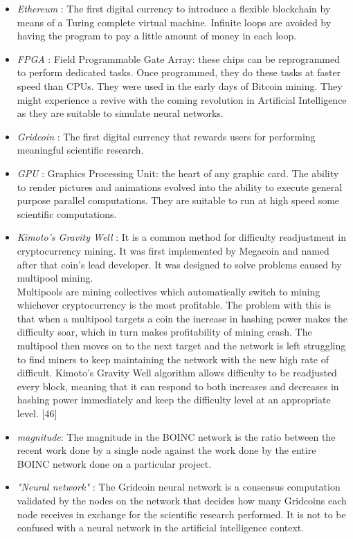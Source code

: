 \begin{itemize}
  \item \textit{Ethereum} : The first digital currency to introduce a flexible blockchain by means of a Turing complete virtual machine. Infinite loops are avoided by having the program to pay a little amount of money in each loop.
  \item \textit{FPGA} : Field Programmable Gate Array: these chips can be reprogrammed to perform dedicated tasks. Once programmed, they do these tasks at faster speed than CPUs. They were used in the early days of Bitcoin mining. They might experience a revive with the coming revolution in Artificial Intelligence as they are suitable to simulate neural networks.
  \item \textit{Gridcoin} : The first digital currency that rewards users for performing meaningful scientific research.
  \item \textit{GPU} : Graphics Processing Unit: the heart of any graphic card. The ability to render pictures and animations evolved into the ability to execute general purpose parallel computations. They are suitable to run at high speed some scientific computations.
  \item \textit{Kimoto's Gravity Well} : It is a common method for difficulty readjustment in cryptocurrency mining. 
  It was first implemented by Megacoin and named after that coin’s lead developer. It was designed to solve problems caused by multipool mining.\\
  Multipools are mining collectives which automatically switch to mining whichever cryptocurrency is the most profitable. The problem with this is that when a multipool targets a coin the increase in hashing power makes the difficulty soar, which in turn makes profitability of mining crash. The multipool then moves on to the next target and the network is left struggling to find miners to keep maintaining the network with the new high rate of difficult. Kimoto’s Gravity Well algorithm allows difficulty to be readjusted every block, meaning that it can respond to both increases and decreases in hashing power immediately and keep the difficulty level at an appropriate level. [46]
  \item \textit{magnitude}: The magnitude in the BOINC network is the ratio between the recent work done by a single node against the work done by the entire BOINC network done on a particular project.
  \item \textit{"Neural network"} : The Gridcoin neural network is a consensus computation validated by the nodes on the network that decides how many Gridcoins each node receives in exchange for the scientific research performed. It is not to be confused with a neural network in the artificial intelligence context.

\end{itemize}
